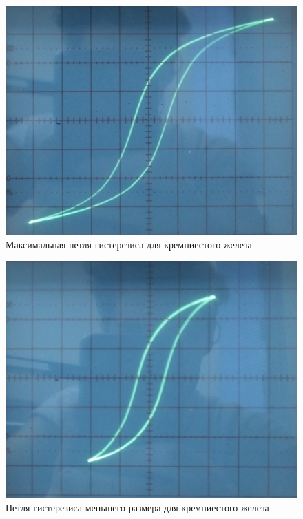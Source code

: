 \documentclass[a4paper, fontsize=14pt]{article}
\begin{document}
\begin{figure}[H]
\center
\includegraphics[scale=0.1]{kr1.jpg}
\caption{Максимальная петля гистерезиса для кремниестого железа}
\end{figure}
\begin{figure}[H]
\center
\includegraphics[scale=0.1]{kr2.jpg}
\caption{Петля гистерезиса меньшего размера для кремниестого железа}
\end{figure}
\end{document}
